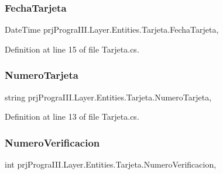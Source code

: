 \subsubsection{\texorpdfstring{Fecha\+Tarjeta}{FechaTarjeta}}
{\footnotesize\ttfamily Date\+Time prj\+Progra\+I\+I\+I.\+Layer.\+Entities.\+Tarjeta.\+Fecha\+Tarjeta\hspace{0.3cm}{\ttfamily [get]}, {\ttfamily [set]}}



Definition at line 15 of file Tarjeta.\+cs.

\hypertarget{classprj_progra_i_i_i_1_1_layer_1_1_entities_1_1_tarjeta_afc73d9bbe1a4f87a41604ef006657c03}{}\label{classprj_progra_i_i_i_1_1_layer_1_1_entities_1_1_tarjeta_afc73d9bbe1a4f87a41604ef006657c03} 
\subsubsection{\texorpdfstring{Numero\+Tarjeta}{NumeroTarjeta}}
{\footnotesize\ttfamily string prj\+Progra\+I\+I\+I.\+Layer.\+Entities.\+Tarjeta.\+Numero\+Tarjeta\hspace{0.3cm}{\ttfamily [get]}, {\ttfamily [set]}}



Definition at line 13 of file Tarjeta.\+cs.

\hypertarget{classprj_progra_i_i_i_1_1_layer_1_1_entities_1_1_tarjeta_abf3fbc88505507f6dfe10177dd073dfc}{}\label{classprj_progra_i_i_i_1_1_layer_1_1_entities_1_1_tarjeta_abf3fbc88505507f6dfe10177dd073dfc} 
\subsubsection{\texorpdfstring{Numero\+Verificacion}{NumeroVerificacion}}
{\footnotesize\ttfamily int prj\+Progra\+I\+I\+I.\+Layer.\+Entities.\+Tarjeta.\+Numero\+Verificacion\hspace{0.3cm}{\ttfamily [get]}, {\ttfamily [set]}}




